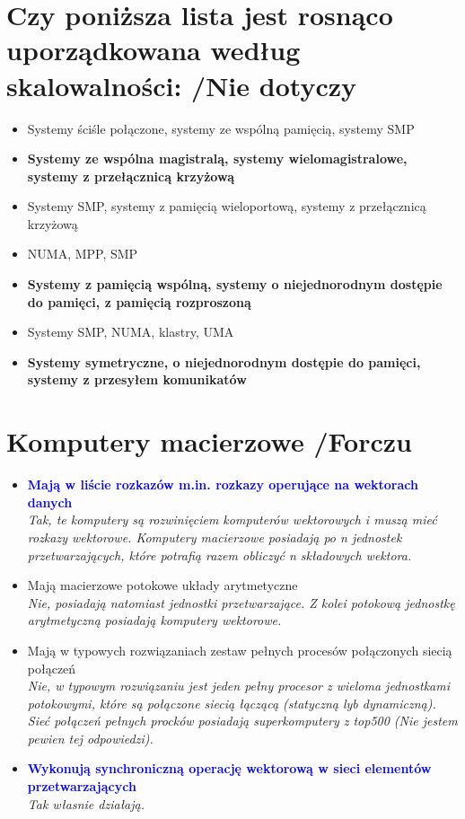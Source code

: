 \section{Czy poniższa lista jest rosnąco uporządkowana według skalowalności: {\small /Nie dotyczy}}
	\begin{itemize}
    \item Systemy ściśle połączone, systemy ze wspólną pamięcią, systemy SMP
    \item \textbf{Systemy ze wspólna magistralą, systemy wielomagistralowe, systemy z przełącznicą krzyżową}
    \item Systemy SMP, systemy z pamięcią wieloportową, systemy z przełącznicą krzyżową
    \item NUMA, MPP, SMP
    \item \textbf{Systemy z pamięcią wspólną, systemy o niejednorodnym dostępie do pamięci, z pamięcią rozproszoną}
    \item Systemy SMP, NUMA, klastry, UMA
    \item \textbf{Systemy symetryczne, o niejednorodnym dostępie do pamięci, systemy z przesyłem komunikatów}
    \end{itemize}
    
\section{Komputery macierzowe {\small /Forczu}}
	\begin{itemize}
    \item \textcolor{Blue}{\textbf{Mają w liście rozkazów m.in. rozkazy operujące na wektorach danych}}\\
    {\small \emph{Tak, te komputery są rozwinięciem komputerów wektorowych i muszą mieć rozkazy wektorowe. Komputery macierzowe posiadają po \emph{n} jednostek przetwarzających, które potrafią razem obliczyć \emph{n} składowych wektora.}}
    \item Mają macierzowe potokowe układy arytmetyczne\\
    {\small \emph{Nie, posiadają natomiast jednostki przetwarzające. Z kolei potokową jednostkę arytmetyczną posiadają komputery wektorowe.}}
    \item Mają w typowych rozwiązaniach zestaw pełnych procesów połączonych siecią połączeń\\
    {\small \emph{Nie, w typowym rozwiązaniu jest jeden pełny procesor z wieloma jednostkami potokowymi, które są połączone siecią łączącą (statyczną lyb dynamiczną). Sieć połączeń pełnych procków posiadają superkomputery z top500 (Nie jestem pewien tej odpowiedzi).}}
    \item \textcolor{Blue}{\textbf{Wykonują synchroniczną operację wektorową w sieci elementów przetwarzających}}\\
    {\small \emph{Tak własnie działają.}}
    \end{itemize}
    
